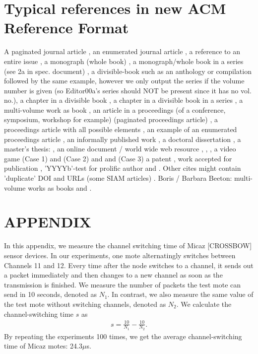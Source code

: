 
\section{Typical references in new ACM Reference Format}
A paginated journal article \cite{Abril07}, an enumerated
journal article \cite{Cohen07}, a reference to an entire issue \cite{JCohen96},
a monograph (whole book) \cite{Kosiur01}, a monograph/whole book in a series (see 2a in spec. document)
\cite{Harel79}, a divisible-book such as an anthology or compilation \cite{Editor00}
followed by the same example, however we only output the series if the volume number is given
\cite{Editor00a} (so Editor00a's series should NOT be present since it has no vol. no.),
a chapter in a divisible book \cite{Spector90}, a chapter in a divisible book
in a series \cite{Douglass98}, a multi-volume work as book \cite{Knuth97},
an article in a proceedings (of a conference, symposium, workshop for example)
(paginated proceedings article) \cite{Andler79}, a proceedings article
with all possible elements \cite{Smith10}, an example of an enumerated
proceedings article \cite{VanGundy07},
an informally published work \cite{Harel78}, a doctoral dissertation \cite{Clarkson85},
a master's thesis: \cite{anisi03}, an online document / world wide web resource \cite{Thornburg01}, \cite{Ablamowicz07},
\cite{Poker06}, a video game (Case 1) \cite{Obama08} and (Case 2) \cite{Novak03}
and \cite{Lee05} and (Case 3) a patent \cite{JoeScientist001},
work accepted for publication \cite{rous08}, 'YYYYb'-test for prolific author
\cite{SaeediMEJ10} and \cite{SaeediJETC10}. Other cites might contain
'duplicate' DOI and URLs (some SIAM articles) \cite{Kirschmer:2010:AEI:1958016.1958018}.
Boris / Barbara Beeton: multi-volume works as books
\cite{MR781536} and \cite{MR781537}.

\appendix
\section*{APPENDIX}
\setcounter{section}{1}
In this appendix, we measure
the channel switching time of Micaz [CROSSBOW] sensor devices.
In our experiments, one mote alternatingly switches between Channels
11 and 12. Every time after the node switches to a channel, it sends
out a packet immediately and then changes to a new channel as soon
as the transmission is finished. We measure the
number of packets the test mote can send in 10 seconds, denoted as
$N_{1}$. In contrast, we also measure the same value of the test
mote without switching channels, denoted as $N_{2}$. We calculate
the channel-switching time $s$ as
\begin{eqnarray}%
  s=\frac{10}{N_{1}}-\frac{10}{N_{2}}. \nonumber
\end{eqnarray}%
By repeating the experiments 100 times, we get the average
channel-switching time of Micaz motes: 24.3$\mu$s.

